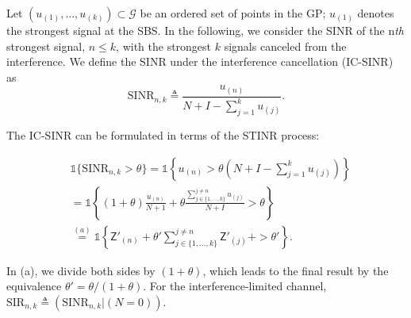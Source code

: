 \documentclass[lettersize,journal]{IEEEtran}
\begin{document}
Let $(u_{(1)},\dots,u_{(k)} )\subset \mathcal{G}$ be an ordered set of points in the GP; $u_{(1)}$ denotes the strongest signal at the SBS. In the following, we consider the SINR of the n\textit{th} strongest signal, $n \leq k$, with the strongest $k$ signals canceled from the interference. We define the SINR under the interference cancellation (IC-SINR) as
\begin{equation}
  \text{SINR}_{n,k} \triangleq \frac{u_{(n)}}{N+I-\sum_{j =1 }^k u_{(j)}}.
\end{equation}


The IC-SINR can be formulated in terms of the STINR process:


\begin{align}
  \label{eq:IC-SINRcond}
   & \mathds{1}\{\text{SINR}_{n,k} > \theta \} = \mathds{1} \left\{ u_{(n)} >\theta\left(N+I-  \sum_{j=1}^ku_{(j)}\right)\right\} \nonumber\\
  &\overset{}{=}\mathds{1} \left\{(1+\theta) \frac{u_{(n)}}{N+1}+ \theta \frac{\sum^{j\neq n}_{j\in\{1,\dots,k\}} u_{(j)}}{N+I}>\theta \right\} \nonumber \\
  &\overset{(a)}{=} \mathds{1} \left\{ \mathsf{Z}'_{(n)}+\theta'\sum^{j\neq n}_{j\in\{1,\dots,k\}}\mathsf{Z}'_{(j)} +>\theta'\right\}.
\end{align}


In (a), we divide both sides by $(1+\theta)$, which leads to the final result by the equivalence $\theta' = \theta/(1+\theta)$. For the interference-limited channel, $\text{SIR}_{n,k} \triangleq (\text{SINR}_{n,k}|(N=0))$.
\end{document}
